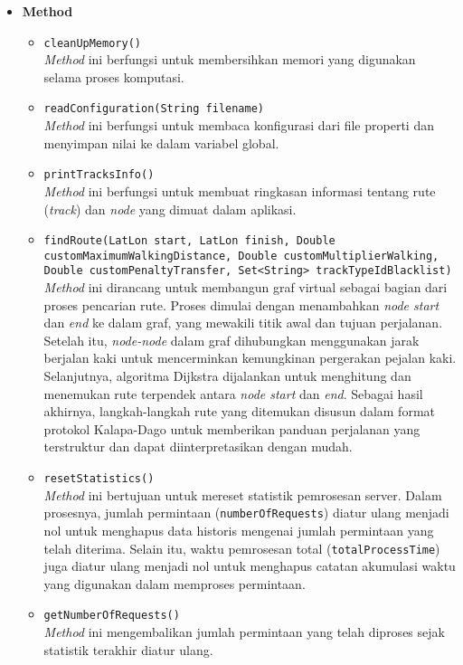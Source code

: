 \begin{itemize}
    \item \textbf{Method}
    \begin{itemize}
        \item \texttt{cleanUpMemory()}
        \\ \textit{Method} ini berfungsi untuk membersihkan memori yang digunakan selama proses komputasi.
        \item \texttt{readConfiguration(String filename)}
        \\ \textit{Method} ini berfungsi untuk membaca konfigurasi dari file properti dan menyimpan nilai ke dalam variabel global.
        \item \texttt{printTracksInfo()}
        \\ \textit{Method} ini berfungsi untuk membuat ringkasan informasi tentang rute (\textit{track}) dan \textit{node} yang dimuat dalam aplikasi.
        \item \texttt{findRoute(LatLon start, LatLon finish, Double customMaximumWalkingDistance, Double customMultiplierWalking, Double customPenaltyTransfer, Set<String> trackTypeIdBlacklist)}
        \\ \textit{Method} ini dirancang untuk membangun graf virtual sebagai bagian dari proses pencarian rute. Proses dimulai dengan menambahkan \textit{node start} dan \textit{end} ke dalam graf, yang mewakili titik awal dan tujuan perjalanan. Setelah itu, \textit{node-node} dalam graf dihubungkan menggunakan jarak berjalan kaki untuk mencerminkan kemungkinan pergerakan pejalan kaki. Selanjutnya, algoritma Dijkstra dijalankan untuk menghitung dan menemukan rute terpendek antara \textit{node start} dan \textit{end}. Sebagai hasil akhirnya, langkah-langkah rute yang ditemukan disusun dalam format protokol Kalapa-Dago untuk memberikan panduan perjalanan yang terstruktur dan dapat diinterpretasikan dengan mudah.
        \item \texttt{resetStatistics()}
        \\ \textit{Method} ini bertujuan untuk mereset statistik pemrosesan server. Dalam prosesnya, jumlah permintaan (\texttt{numberOfRequests}) diatur ulang menjadi nol untuk menghapus data historis mengenai jumlah permintaan yang telah diterima. Selain itu, waktu pemrosesan total (\texttt{totalProcessTime}) juga diatur ulang menjadi nol untuk menghapus catatan akumulasi waktu yang digunakan dalam memproses permintaan. 
        \item \texttt{getNumberOfRequests()}
        \\ \textit{Method} ini mengembalikan jumlah permintaan yang telah diproses sejak statistik terakhir diatur ulang.

\end{itemize}
\end{itemize}
